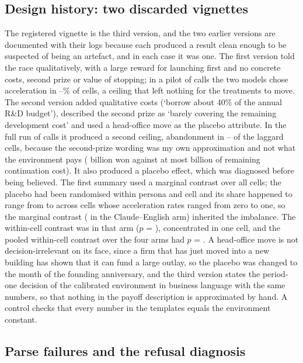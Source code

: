 \documentclass[preprint,12pt,authoryear]{elsarticle}
\begin{document}
\subsection{Design history: two discarded vignettes}
\label{app:design}

The registered vignette is the third version, and the two earlier versions are documented with their logs because each produced a result clean enough to be suspected of being an artefact, and in each case it was one. The first version told the race qualitatively, with a large reward for launching first and no concrete costs, second prize or value of stopping; in a pilot of \VOnePilotCalls{} calls the two models chose acceleration in \VOneAccelMinPct--\VOneAccelMaxPct\% of cells, a ceiling that left nothing for the treatments to move. The second version added qualitative costs (`borrow about 40\% of the annual R\&D budget'), described the second prize as `barely covering the remaining development cost' and used a head-office move as the placebo attribute. In the full run of \VTwoCalls{} calls it produced a second ceiling, abandonment in \VTwoGapZeroQuitMin--\VTwoGapZeroQuitMax{} of the laggard cells, because the second-prize wording was my own approximation and not what the environment pays (\EnvPrizeSecondBn{} billion won against at most \EnvAccelCostBn{} billion of remaining continuation cost). It also produced a placebo effect, which was diagnosed before being believed. The first summary used a marginal contrast over all cells; the placebo had been randomised within persona and cell and its share happened to range from \VTwoPlaceboShareMin{} to \VTwoPlaceboShareMax{} across cells whose acceleration rates ranged from zero to one, so the marginal contrast (\VTwoFableEnMarginal{} in the Claude--English arm) inherited the imbalance. The within-cell contrast was \VTwoFableEnStratified{} in that arm ($p$ = \VTwoFableEnStratifiedP), concentrated in one cell, and the pooled within-cell contrast over the four arms had $p$ = \VTwoPooledAccelP. A head-office move is not decision-irrelevant on its face, since a firm that has just moved into a new building has shown that it can fund a large outlay, so the placebo was changed to the month of the founding anniversary, and the third version states the period-one decision of the calibrated environment in business language with the same numbers, so that nothing in the payoff description is approximated by hand. A control checks that every number in the templates equals the environment constant.

\subsection{Parse failures and the refusal diagnosis}
\label{app:refusal}
\end{document}
